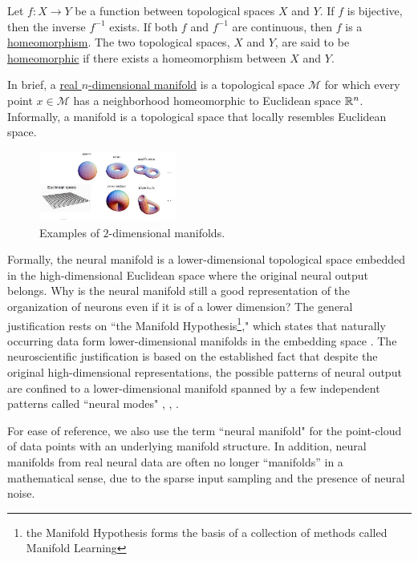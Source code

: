 \begin{defn}[Homeomorphism]
Let $f: X \to Y$ be a function between topological spaces $X$ and $Y$. If $f$ is bijective, then the inverse $f^{-1}$ exists. If both $f$ and $f^{-1}$ are continuous, then $f$ is a \underline{homeomorphism}. The two topological spaces, $X$ and $Y$, are said to be \underline{homeomorphic} if there exists a homeomorphism between $X$ and $Y$. 
\end{defn}
    \begin{defn}[Manifold]
   In brief, a \underline{real $n$-dimensional manifold} is a topological space $\mathcal{M}$ for which every point $x\in\mathcal{M}$ has a neighborhood homeomorphic to Euclidean space $\mathbb R^n$. Informally, a manifold is a topological space that locally resembles Euclidean space.
    \end{defn}
   \begin{figure}[H]
      \centering
     \includegraphics[width=0.4\textwidth]{figures/intro/manifold.jpg}
     \caption{Examples of $2$-dimensional manifolds.}
    \end{figure} 
            
Formally, the neural manifold is a lower-dimensional topological space embedded in the high-dimensional Euclidean space where the original neural output belongs. Why is the neural manifold still a good representation of the organization of neurons even if it is of a lower dimension?  The general justification rests on ``the Manifold Hypothesis\footnote{the Manifold Hypothesis forms the basis of a collection of methods called Manifold Learning}," which states that naturally occurring data form lower-dimensional manifolds in the embedding space \cite{colah-manifold}. The neuroscientific justification is based on the established fact that despite the original high-dimensional representations, the possible patterns of neural output are confined to a lower-dimensional manifold spanned by a few independent patterns called ``neural modes"  \cite{gallego_neural_2017}, \cite{stopfer_intensity_2003}, \cite{yu_gaussian-process_2009}.

\begin{rmk}
For ease of reference, we also use the term ``neural manifold" for the point-cloud of data points with an underlying manifold structure. In addition, neural manifolds from real neural data are often no longer ``manifolds” in a mathematical sense, due to the sparse input sampling and the presence of neural noise. 
\end{rmk}


